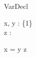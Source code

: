 \begin{zsection}
  \SECTION VarDecl
\end{zsection}

\begin{axdef}
  x, y : \{1\}\\
  z : \power \nat
\end{axdef}

\begin{axdef}
\where
  x = y \in z
\end{axdef} 
